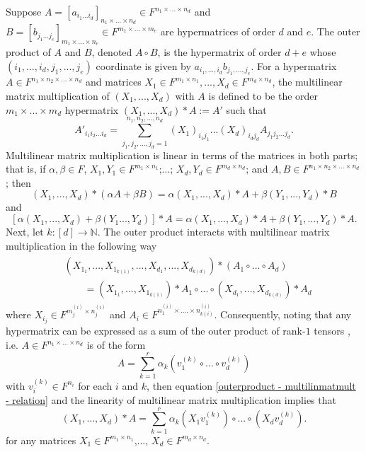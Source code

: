 \documentclass{article}
\begin{document}
Suppose $A = [a_{i_1...i_d}]_{n_1\times...\times n_d}\in F^{n_1\times...\times n_d}$ and $B = [b_{j_1...j_e}]_{m_1\times...\times n_e}\in F^{m_1\times...\times m_e}$ are hypermatrices of order $d$ and $e$. The outer product of $A$ and $B$, denoted $A\circ B$, is the hypermatrix of order $d+e$ whose $(i_1,...,i_d,j_1,...,j_e)$ coordinate is given by $a_{i_1,...,i_d}b_{j_1,...,j_e}$. For a hypermatrix $A\in F^{n_1\times n_2\times...\times n_d}$ and matrices $X_1\in F^{m_1\times n_1},...,X_d\in F^{m_d\times n_d}$, the multilinear matrix multiplication of $(X_1,...,X_d)$ with $A$ is defined to be the order $m_1\times...\times m_d$ hypermatrix $(X_1,...,X_d)*A := A'$ such that
\[A'_{i_1i_2...i_d} = \sum\limits_{j_1,j_2,...,j_d=1}^{n_1,n_2,...,n_d}(X_1)_{i_1j_1}...(X_d)_{i_dj_d}A_{j_1j_2...j_d}.\]
Multilinear matrix multiplication is linear in terms of the matrices in both parts; that is, if $\alpha,\beta\in F$, $X_1,Y_1\in F^{m_1\times n_1}$;...; $X_d,Y_d\in F^{m_d\times n_d}$; and $A,B\in F^{n_1\times n_2\times...\times n_d}$; then 
\[(X_1,...,X_d)*(\alpha A + \beta B) = \alpha(X_1,...,X_d)*A + \beta(Y_1,...,Y_d)*B\]
and 
\[[\alpha(X_1,...,X_d)+\beta(Y_1...,Y_d)]*A = \alpha(X_1,...,X_d)*A + \beta(Y_1,...,Y_d)*A.\]
Next, let $k:[d]\rightarrow \mathbb{N}$. The outer product interacts with multilinear matrix multiplication in the following way
\begin{eqnarray}\label{outerproduct - multilinmatmult - relation}
    \begin{aligned}
        &(X_{1_1},...,X_{1_{k(1)}},...,X_{d_1},...,X_{d_{k(d)}})*(A_1\circ...\circ A_d) \\
        &\qquad = (X_{1_1},...,X_{1_{k(1)}})*A_1\circ...\circ (X_{d_1},...,X_{d_{k(d)}})*A_d
    \end{aligned} 
\end{eqnarray}
where $X_{i_j}\in F^{m^{(i)}_j\times n^{(i)}_j}$ and $A_i\in F^{n^{(i)}_1\times....\times n^{(i)}_{k(i)}}$. Consequently, noting that any hypermatrix can be expressed as a sum of the outer product of rank-$1$ tensors \cite{lim2013tensors}, i.e. $A\in F^{n_1\times...\times n_d}$ is of the form
\[A = \sum\limits_{k=1}^r\alpha_k(v_1^{(k)}\circ...\circ v_d^{(k)})\]
with $v_i^{(k)}\in F^{n_i}$ for each $i$ and $k$, then equation \eqref{outerproduct - multilinmatmult - relation} and the linearity of multilinear matrix multiplication implies that 
\begin{equation}\label{outerproduct - multilinmatmult - special case}
    (X_1,...,X_d)*A = \sum\limits_{k=1}^r\alpha_k(X_1v_1^{(k)})\circ...\circ (X_dv_d^{(k)}).
\end{equation}
for any matrices $X_1\in F^{m_1\times n_1}$,..., $X_d\in F^{m_d\times n_d}$.
\end{document}
